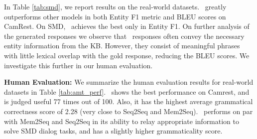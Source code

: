 In Table \ref{tab:smd}, we report results on the real-world datasets. \sys\ greatly outperforms other models in both Entity F1 metric and BLEU scores on CamRest. On SMD, \sys\ achieves the best only in Entity F1. On further analysis of the generated responses we observe that \sys\ responses often convey the necessary entity information from the KB. However, they consist of meaningful phrases with little lexical overlap with the gold response, reducing the BLEU scores. We investigate this further in our human evaluation.

\noindent \textbf{Human Evaluation:}
We summarize the human evaluation results for real-world datasets in Table \ref{tab:amt_perf}. \sys\ shows the best performance on Camrest, and is judged useful 77 times out of 100. Also, it has the highest average grammatical correctness score of 2.28 (very close to Seq2Seq and Mem2Seq). \sys\ performs on par with Mem2Seq and Seq2Seq in its ability to relay appropriate information to solve SMD dialog tasks, and has a slightly higher grammaticality score.

